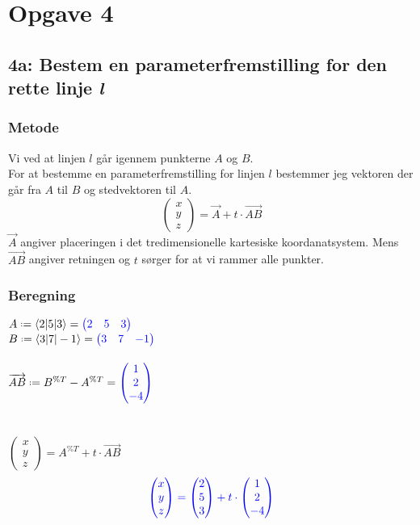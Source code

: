\documentclass[../main.tex]{subfiles}
\begin{document}
\section*{Opgave 4}
\subsection*{4a: Bestem en parameterfremstilling for den rette linje \textit{l}}
    \subsubsection*{Metode}
        Vi ved at linjen \(l\) går igennem punkterne \(A\) og \(B\).\\
        For at bestemme en parameterfremstilling for linjen \(l\) bestemmer jeg vektoren der går fra \(A\) til \(B\) og stedvektoren til \(A\).\\
        \[\begin{pmatrix} x\\y\\z \end{pmatrix}=\overrightarrow{A}+t\cdot \overrightarrow{AB}\]
        \(\overrightarrow{A}\) angiver placeringen i det tredimensionelle kartesiske koordanatsystem. Mens \(\overrightarrow{AB}\) angiver retningen og \(t\) sørger for at vi rammer alle punkter.
    \subsubsection*{Beregning}
        \(A \defeq \langle 2|5|3 \rangle = \textcolor{blue}{\begin{pmatrix} 2 & 5 & 3 \end{pmatrix}}\)\\
        \(B \defeq \langle 3|7|-1 \rangle = \textcolor{blue}{\begin{pmatrix} 3 & 7 & -1 \end{pmatrix}}\)\\\\
        \(\overrightarrow{AB} \defeq B^{\%T} - A^{\%T}=\textcolor{blue}{\begin{pmatrix} 1 \\ 2 \\ -4 \end{pmatrix}} \)\\\\\\
        \(\begin{pmatrix} x \\ y \\ z \end{pmatrix}= A^{\%T}+t \cdot \overrightarrow{AB}\)
        \[\textcolor{blue}{\begin{pmatrix} x \\ y \\ z \end{pmatrix}=\begin{pmatrix} 2 \\ 5 \\ 3 \end{pmatrix} + t \cdot \begin{pmatrix} 1 \\ 2 \\ -4 \end{pmatrix}}\]
\end{document}
